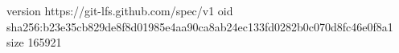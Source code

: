 version https://git-lfs.github.com/spec/v1
oid sha256:b23e35cb829de8f8d01985e4aa90ca8ab24ec133fd0282b0c070d8fc46e0f8a1
size 165921
